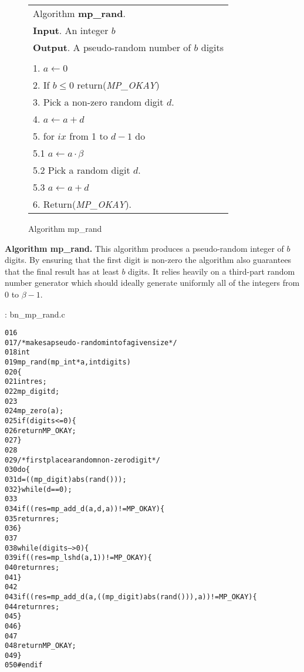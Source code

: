 \documentclass[b5paper]{book}
\begin{document}
\newpage\begin{figure}[!here]
\begin{small}
\begin{center}
\begin{tabular}{l}
\hline Algorithm \textbf{mp\_rand}. \\
\textbf{Input}.   An integer $b$ \\
\textbf{Output}.  A pseudo-random number of $b$ digits \\
\hline \\
1.  $a \leftarrow 0$ \\
2.  If $b \le 0$ return(\textit{MP\_OKAY}) \\
3.  Pick a non-zero random digit $d$. \\
4.  $a \leftarrow a + d$ \\
5.  for $ix$ from 1 to $d - 1$ do \\
\hspace{3mm}5.1  $a \leftarrow a \cdot \beta$ \\
\hspace{3mm}5.2  Pick a random digit $d$. \\
\hspace{3mm}5.3  $a \leftarrow a + d$ \\
6.  Return(\textit{MP\_OKAY}). \\
\hline
\end{tabular}
\end{center}
\end{small}
\caption{Algorithm mp\_rand}
\end{figure}
\textbf{Algorithm mp\_rand.}
This algorithm produces a pseudo-random integer of $b$ digits.  By ensuring that the first digit is non-zero the algorithm also guarantees that the
final result has at least $b$ digits.  It relies heavily on a third-part random number generator which should ideally generate uniformly all of
the integers from $0$ to $\beta - 1$.  

\vspace{+3mm}\begin{small}
\hspace{-5.1mm}{\bf File}: bn\_mp\_rand.c
\vspace{-3mm}
\begin{alltt}
016   
017   /* makes a pseudo-random int of a given size */
018   int
019   mp_rand (mp_int * a, int digits)
020   \{
021     int     res;
022     mp_digit d;
023   
024     mp_zero (a);
025     if (digits <= 0) \{
026       return MP_OKAY;
027     \}
028   
029     /* first place a random non-zero digit */
030     do \{
031       d = ((mp_digit) abs (rand ()));
032     \} while (d == 0);
033   
034     if ((res = mp_add_d (a, d, a)) != MP_OKAY) \{
035       return res;
036     \}
037   
038     while (digits-- > 0) \{
039       if ((res = mp_lshd (a, 1)) != MP_OKAY) \{
040         return res;
041       \}
042   
043       if ((res = mp_add_d (a, ((mp_digit) abs (rand ())), a)) != MP_OKAY) \{
044         return res;
045       \}
046     \}
047   
048     return MP_OKAY;
049   \}
050   #endif
\end{alltt}
\end{small}
\end{document}
